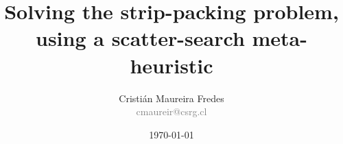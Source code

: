 \documentclass{beamer}
\author[C. Maureira]{\large Cristián Maureira Fredes\\\normalsize \textcolor{gray}{cmaureir@csrg.cl}}
\title[Solving Strip-Packing using Scatter-Search]{Solving the strip-packing problem, using a scatter-search meta-heuristic}
\institute[UTFSM]{Departamento de Informática\\Universidad Técnica Federico Santa María}
\date{\today}
\begin{document}
\begin{frame}[t,plain]
\titlepage
\end{frame}





\begin{frame}[t,plain]
\titlepage
\end{frame}
\end{document}
